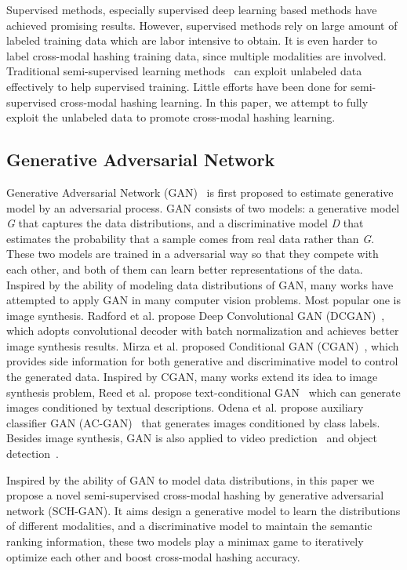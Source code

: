 \documentclass[journal]{IEEEtran}
\begin{document}
Supervised methods, especially supervised deep learning based methods have achieved promising results. However, supervised methods rely on large amount of labeled training data which are labor intensive to obtain. It is even harder to label cross-modal hashing training data, since multiple modalities are involved. Traditional semi-supervised learning methods~\cite{semi} can exploit unlabeled data effectively to help supervised training. Little efforts have been done for semi-supervised cross-modal hashing learning. In this paper, we attempt to fully exploit the unlabeled data to promote cross-modal hashing learning.

\subsection{Generative Adversarial Network}
Generative Adversarial Network (GAN)~\cite{gan} is first proposed to estimate generative model by an adversarial process. GAN consists of two models: a generative model \textit{G} that captures the data distributions, and a discriminative model \textit{D} that estimates the probability that a sample comes from real data rather than \textit{G}. These two models are trained in a adversarial way so that they compete with each other, and both of them can learn better representations of the data. Inspired by the ability of modeling data distributions of GAN, many works have attempted to apply GAN in many computer vision problems. Most popular one is image synthesis. Radford et al. propose Deep Convolutional GAN (DCGAN)~\cite{dcgan}, which adopts convolutional decoder with batch normalization and achieves better image synthesis results. Mirza et al. proposed Conditional GAN (CGAN)~\cite{cgan}, which provides side information for both generative and discriminative model to control the generated data. Inspired by CGAN, many works extend its idea to image synthesis problem, Reed et al. propose text-conditional GAN~\cite{gancls} which can generate images conditioned by textual descriptions. Odena et al. propose auxiliary classifier GAN (AC-GAN)~\cite{acgan} that generates images conditioned by class labels. Besides image synthesis, GAN is also applied to video prediction~\cite{videogan} and object detection~\cite{obgan}.

Inspired by the ability of GAN to model data distributions, in this paper we propose a novel semi-supervised cross-modal hashing by generative adversarial network (SCH-GAN). It aims design a generative model to learn the distributions of different modalities, and a discriminative model to maintain the semantic ranking information, these two models play a minimax game to iteratively optimize each other and boost cross-modal hashing accuracy.
\end{document}
